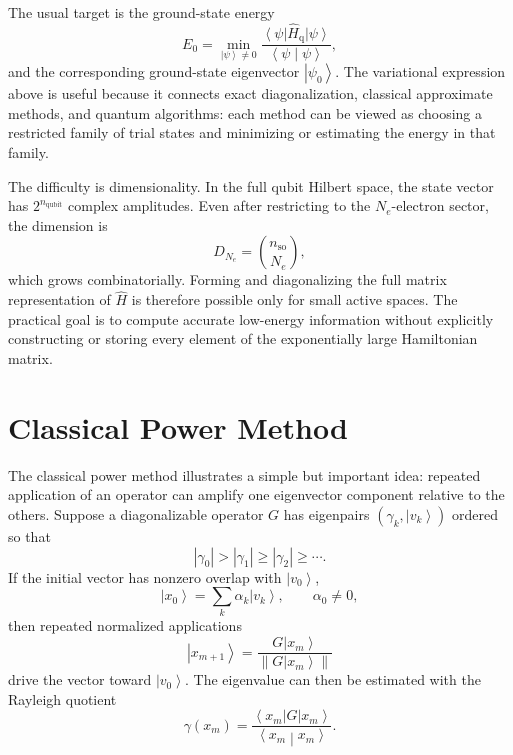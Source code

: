 \documentclass[11pt]{article}
\newcommand{\ket}[1]{\left|#1\right\rangle}
\newcommand{\bra}[1]{\left\langle#1\right|}
\newcommand{\braket}[2]{\left\langle#1\middle|#2\right\rangle}
\newcommand{\norm}[1]{\left\lVert#1\right\rVert}
\begin{document}
The usual target is the ground-state energy
\begin{equation}
    E_0 = \min_{\ket{\psi}\neq 0}
    \frac{\bra{\psi}\hat{H}_{\mathrm{q}}\ket{\psi}}{\braket{\psi}{\psi}},
\end{equation}
and the corresponding ground-state eigenvector $\ket{\psi_0}$.  The variational expression above is useful because it connects exact diagonalization, classical approximate methods, and quantum algorithms: each method can be viewed as choosing a restricted family of trial states and minimizing or estimating the energy in that family.

The difficulty is dimensionality.  In the full qubit Hilbert space, the state vector has $2^{n_{\mathrm{qubit}}}$ complex amplitudes.  Even after restricting to the $N_e$-electron sector, the dimension is
\begin{equation}
    D_{N_e}=\binom{n_{\mathrm{so}}}{N_e},
\end{equation}
which grows combinatorially.  Forming and diagonalizing the full matrix representation of $\hat{H}$ is therefore possible only for small active spaces.  The practical goal is to compute accurate low-energy information without explicitly constructing or storing every element of the exponentially large Hamiltonian matrix.

\section{Classical Power Method}

The classical power method illustrates a simple but important idea: repeated application of an operator can amplify one eigenvector component relative to the others.  Suppose a diagonalizable operator $G$ has eigenpairs $(\gamma_k,\ket{v_k})$ ordered so that
\begin{equation}
    |\gamma_0|>|\gamma_1|\geq |\gamma_2|\geq\cdots.
\end{equation}
If the initial vector has nonzero overlap with $\ket{v_0}$,
\begin{equation}
    \ket{x_0}=\sum_k \alpha_k\ket{v_k},
    \qquad \alpha_0\neq 0,
\end{equation}
then repeated normalized applications
\begin{equation}
    \ket{x_{m+1}}=\frac{G\ket{x_m}}{\norm{G\ket{x_m}}}
\end{equation}
drive the vector toward $\ket{v_0}$.  The eigenvalue can then be estimated with the Rayleigh quotient
\begin{equation}
    \gamma(x_m)=\frac{\bra{x_m}G\ket{x_m}}{\braket{x_m}{x_m}}.
\end{equation}
\end{document}
